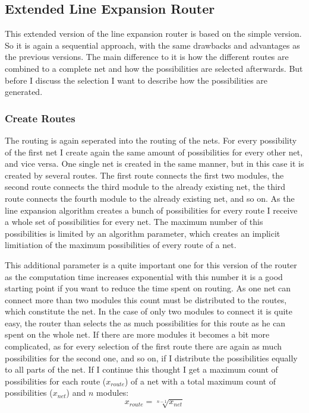 \subsection{Extended Line Expansion Router}
This extended version of the line expansion router is based on the simple version. So it is again a sequential approach, with the same drawbacks and advantages as the previous versions. The main difference to it is how the different routes are combined to a complete net and how the possibilities are selected afterwards. But before I discuss the selection I want to describe how the possibilities are generated.

\subsubsection{Create Routes}
The routing is again seperated into the routing of the nets. For every possibility of the first net I create again the same amount of possibilities for every other net, and vice versa. One single net is created in the same manner, but in this case it is created by several routes. The first route connects the first two modules, the second route connects the third module to the already existing net, the third route connects the fourth module to the already existing net, and so on. As the line expansion algorithm creates a bunch of possibilities for every route I receive a whole set of possibilities for every net. The maximum number of this possibilities is limited by an algorithm parameter, which creates an implicit limitiation of the maximum possibilities of every route of a net.

This additional parameter is a quite important one for this version of the router as the computation time increases exponential with this number it is a good starting point if you want to reduce the time spent on routing. As one net can connect more than two modules this count must be distributed to the routes, which constitute the net. In the case of only two modules to connect it is quite easy, the router than selects the as much possibilities for this route as he can spent on the whole net. If there are more modules it becomes a bit more complicated, as for every selection of the first route there are again as much possibilities for the second one, and so on, if I distribute the possibilities equally to all parts of the net. If I continue this thought I get a maximum count of possibilities for each route ($x_{route}$) of a net with a total maximum count of possibilities ($x_{net}$) and $n$ modules:
\[x_{route} = \sqrt[n - 1]{x_{net}}\]

